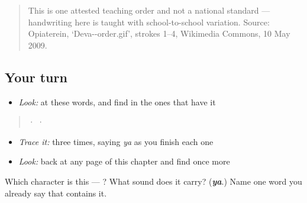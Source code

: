 \begin{quote}
This is one attested teaching order and not a national standard — handwriting here is taught with school-to-school variation. Source: Opiaterein, ‘Deva--order.gif’, strokes 1–4, Wikimedia Commons, 10 May 2009.
\end{quote}

\subsection*{Your turn}
\begin{itemize}
\raggedright
  \item \emph{Look:} at these words, and find  in the ones that have it
\end{itemize}

\begin{quote}
  ·    ·  
\end{quote}

\begin{itemize}
\raggedright
  \item \emph{Trace it:}  three times, saying \emph{ya} as you finish each one
  \item \emph{Look:} back at any page of this chapter and find  once more
\end{itemize}

\begin{tcolorbox}[breakable,colback=teal!4,colframe=teal!35!black,title={Before you move on}]
Which character is this — ? What sound does it carry? (\emph{\textbf{ya}}.) Name one word you already say that contains it.
\end{tcolorbox}
